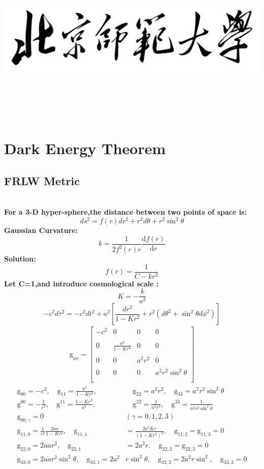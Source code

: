 \documentclass[14pt]{article}
\title{
    \begin{center}
      \includegraphics[scale=1.6]{BNU_name.jpg}
    \end{center}
    \vspace{2.5in}
    \Huge{\textbf{\hmwkClass}}\\
    \vspace{1in}
}
\author{\textbf{\hmwkAuthorNameCover}}
\date{}
\newcommand{\derivo}[2]{\frac{\mathrm{d} #1 }{\mathrm{d} #2}}
\newcommand{\g}{\mathrm{g}}
\begin{document}
\maketitle
\pagebreak

\section{Dark Energy Theorem}

\subsection{FRLW Metric}
\quad\\
\textbf{For a 3-D hyper-sphere,the distance between two points of space is:}
\[
ds^{2} = f(r)dr^{2}+r^{2}d\theta +r^{2}\sin^{2}\theta\tag{1.1.1}
\]
\textbf{Gaussian Curvature:}
\[
k=\frac{1}{2f^{2}(r)r}\derivo{f(r)}{r}\tag{1.1.2}
\]
\textbf{Solution:}
\[
f(r)=\frac{1}{C-kr^{2}} \tag{1.1.3}
\]
\textbf{Let C=1,and introduce cosmological scale :}
\[
K=-\frac{k}{a^{2}} \tag{1.1.4}
\]
\[
-c^{2}d\tau^{2} = -c^{2}dt^{2}+a^{2}[\displaystyle\frac{dr^{2}}{1-Kr^{2}}+r^{2}(d\theta^{2}+\sin^{2}\theta d\phi^{2})] \tag{1.1.5}
\]
\begin{align*}
\g_{\mu\nu}=
\left[
    \begin{array}{cccc}
        -c^{2} & 0 & 0 & 0\\\\
        0 & \frac{a^{2}}{1-Kr^{2}} & 0 & 0\\\\
        0 & 0 & a^{2}r^{2} & 0\\\\
        0 & 0 & 0 & a^{2}r^{2}\sin^{2}\theta\\\\
    \end{array}
\right]    \tag{1.1.6}
\end{align*}
\begin{align*}
\g_{00} = -c^{2},\quad \g_{11} = \frac{a^{2}}{1-Kr^{2}},&\quad \g_{22} = a^{2}r^{2},\quad \g_{33}=a^{2}r^{2}\sin^{2}\theta \tag{1.1.7}\\
\g^{00} = -\frac{1}{c^{2}},\quad \g^{11} = \frac{1-Kr^{2}}{a^{2}},&\quad \g^{22} = \frac{1}{a^{2}r^{2}},\quad \g^{33}=\frac{1}{a^{2}r^{2}\sin^{2}\theta} \tag{1.1.8}\\
\g_{00,\gamma} = 0 \quad& (\gamma = 0,1,2,3) \tag{1.1.9}\\
\g_{11,0} = \frac{1}{c^{2}}\frac{2a\dot{a}}{1-Kr^{2}},\quad\g_{11,1} &= \frac{2a^{2}Kr}{(1-Kr^{2})^{2}},\quad\g_{11,2} =\g_{11,3} =0\tag{1.1.10}\\
\g_{22,0} = 2a\dot{a}r^{2},\quad\g_{22,1}&=2a^{2}r,\quad\g_{22,2} =\g_{22,3} =0\tag{1.1.11}\\
\g_{33,0} = 2a\dot{a}r^{2}\sin^{2}\theta,\quad\g_{33,1}=2a^{2}&r\sin^{2}\theta,\quad\g_{33,2}=2a^{2}r\sin^{2},\quad\g_{33,3} =0\tag{1.1.12}\\
\end{align*}
\end{document}
